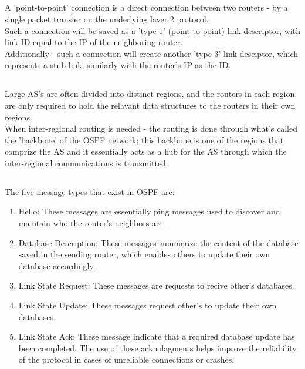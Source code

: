 \subsection{}
A 'point-to-point' connection is a direct connection between
two routers - by a single packet transfer on the underlying layer
2 protocol.\\
Such a connection will be saved as a 'type 1' (point-to-point) link descriptor,
with link ID equal to the IP of the neighboring router.\\
Additionally - such a connection will create another 'type 3' link desciptor,
which represents a stub link, similarly with the router's IP
as the ID.

\subsection{}
Large AS's are often divided into distinct regions,
and the routers in each region are only required to hold
the relavant data structures to the routers in their own regions.\\
When inter-regional routing is needed - the routing is done through what's
called the 'backbone' of the OSPF network; this backbone is
one of the regions that comprize the AS and it essentially
acts as a hub for the AS through which the inter-regional
communications is transmitted.

\subsection{}
The five message types that exist in OSPF are:
\begin{enumerate}
	\item Hello: These messages are essentially ping messages
	used to discover and maintain who the router's neighbors are.
	\item Database Description: These messages summerize
	the content of the database saved in the sending router,
	which enables others to update their own database accordingly.
	\item Link State Request: These messages are requests to
	recive other's databases.
	\item Link State Update: These messages request other's
	to update their own databases.
	\item Link State Ack: These message indicate that a required database
	update has been completed. The use of these acknolagments helps
	improve the reliability of the protocol in cases of unreliable connections
	or crashes.
\end{enumerate}
